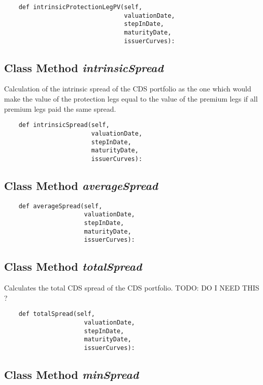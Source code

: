\documentclass[twoside,11pt]{book}
\begin{document}
\begin{lstlisting}
    def intrinsicProtectionLegPV(self,
                                 valuationDate,
                                 stepInDate,
                                 maturityDate,
                                 issuerCurves):
\end{lstlisting}

\subsection{Class Method {\it intrinsicSpread}}
Calculation of the intrinsic spread of the CDS portfolio as the one which would make the value of the protection legs equal to the value of the premium legs if all premium legs paid the same spread. 

\begin{lstlisting}
    def intrinsicSpread(self, 
                        valuationDate,
                        stepInDate,
                        maturityDate,
                        issuerCurves):
\end{lstlisting}

\subsection{Class Method {\it averageSpread}}


\begin{lstlisting}
    def averageSpread(self, 
                      valuationDate,
                      stepInDate,
                      maturityDate,
                      issuerCurves):
\end{lstlisting}

\subsection{Class Method {\it totalSpread}}
Calculates the total CDS spread of the CDS portfolio. TODO: DO I NEED THIS ? 

\begin{lstlisting}
    def totalSpread(self, 
                      valuationDate,
                      stepInDate,
                      maturityDate,
                      issuerCurves):
\end{lstlisting}

\subsection{Class Method {\it minSpread}}
\end{document}
